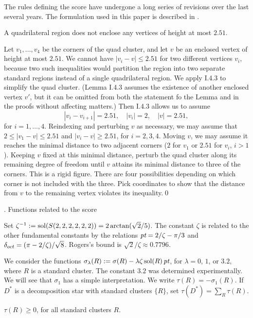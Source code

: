 The rules defining the score
have undergone a long series of revisions
over the last several years.  The formulation used in this
paper is described in \cite{F}.

A quadrilateral region does not enclose any
vertices of height at most $2.51$.
\endproclaim

Let $v_1,\ldots,v_4$ be the corners of the quad cluster, and
let $v$ be an enclosed vertex of height at most $2.51$.
We cannot have $|v_i-v|\le2.51$ for two different vertices
$v_i$,  because two
such inequalities would partition the region into
 two separate
standard regions instead of a single quadrilateral region.
We apply I.4.3 to simplify the quad cluster.  (Lemma I.4.3 assumes
the existence of another enclosed vertex $v'$, but it can be
omitted from both the statement fo the Lemma and in the proofs without
affecting matters.)  Then I.4.3 allows us to assume
$$|v_i-v_{i+1}|=2.51,\quad |v_i|=2, \quad |v|=2.51,$$
for $i=1,\ldots,4$.
Reindexing and perturbing $v$ as necessary, 
we may assume that $2\le |v_1-v|\le2.51$
and $|v_i-v|\ge2.51$, for $i=2,3,4$. 
Moving $v$, we may assume it reaches the minimal distance to two adjacent
corners ($2$ for $v_1$ or $2.51$ for $v_i$, $i>1$).  Keeping $v$
fixed at this minimal distance, perturb the quad cluster along its
remaining degree of freedom until $v$ attains its minimal distance
to three of the corners.  This is a rigid figure.  There are four
possibilities depending on which corner is not included with the three.
Pick coordinates to show that the distance from $v$ to the remaining
vertex violates its inequality.\qed
\enddemo


. Functions related to the score\endhead

Set $\zeta^{-1}:=\operatorname{sol}(S(2,2,2,2,2,2))=2\arctan(\sqrt{2}/5)$.
The constant $\zeta$ is related to the other fundamental
constants by the relations $\hbox{\it pt}= 2/\zeta-\pi/3$ and
$\delta_{oct}=(\pi-2/\zeta)/\sqrt{8}$.  Rogers's bound
is $\sqrt{2}/\zeta\approx 0.7796$.

We consider the functions
$\sigma_\lambda(R):=\sigma(R)-\lambda \zeta\operatorname{sol}(R)\,\hbox{\it pt}$, for
$\lambda=0$, $1$, or $3.2$, where
$R$ is a standard cluster.
The constant $3.2$ was determined experimentally.
We will see that $\sigma_1$ has a simple interpretation.  
 We write $\tau(R) = -\sigma_1(R)$.
If $D^*$ is a decomposition star with standard clusters $\{R\}$, set
$\tau(D^*) = \sum_{R}\tau(R)$.
\smallskip

$\tau(R)\ge 0$, for all standard clusters $R$.
\endproclaim


